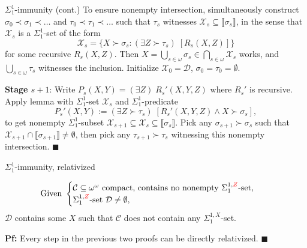\begin{frame}{$\Sigma_1^{1}$-immunity (cont.)}
  To ensure nonempty intersection, simultaneously construct
  $\sigma_0\prec\sigma_1\prec\ldots$ and $\tau_0\prec\tau_1\prec\ldots$
  such that $\tau_s$ witnesses $\mathcal{X}_s \subseteq
  \llbracket\sigma_s\rrbracket$, in the sense that $\mathcal{X}_s$ is a
  $\Sigma^1_1$-set of the form
  \[\mathcal{X}_s =\{X\succ\sigma_s: (\exists Z\succ\tau_s)\;
  [R_s(X,Z)]\}\]
  for some recursive $R_s(X,Z)$. Then $X=\bigcup_{s\in\omega} \sigma_s \in
  \bigcap_{s\in\omega} \mathcal{X}_s$ works, and
  $\bigcup_{s\in\omega} \tau_s$ witnesses the inclusion. Initialize
  $\mathcal{X}_0=\mathcal{D}$, $\sigma_0=\tau_0=\emptyset$.

  \vspace{1em}
  \textbf{Stage $s+1$}: Write $P_s(X,Y) =(\exists Z)\; R_s'(X,Y,Z)$ where
  $R_s'$ is recursive. Apply lemma with $\Sigma^1_1$-set
  $\mathcal{X}_s$ and $\Sigma^1_1$-predicate 
  \[P_s'(X,Y) :=(\exists Z\succ\tau_s)\; [R_s'(X,Y,Z) \wedge
  X\succ\sigma_s],\]
  to get nonempty $\Sigma^1_1$-subset $\mathcal{X}_{s+1} \subseteq
  \mathcal{X}_s \subseteq \llbracket\sigma_s\rrbracket$. Pick any
  $\sigma_{s+1}\succ\sigma_s$ such that $\mathcal{X}_{s+1}\cap
  \llbracket\sigma_{s+1}\rrbracket \neq\emptyset$, then pick any
  $\tau_{s+1}\succ\tau_s$ witnessing this nonempty intersection.
  $\blacksquare$
\end{frame}

\begin{frame}{$\Sigma_1^{1}$-immunity, relativized}
  \begin{coro*}
    \begin{align*}
      \text{Given } &\begin{cases}
        \mathcal{C}\subseteq\omega^\omega \text{ compact, contains
        no nonempty } \Sigma^{1,\textcolor{red}{Z}}_{1}\text{-set},\\
        \Sigma^{1,\textcolor{red}{Z}}_{1}\text{-set }
        \mathcal{D}\neq\emptyset,
      \end{cases}
    \end{align*}
    $\mathcal{D}$ contains some $X$ such that $\mathcal{C}$ does not
    contain any $\Sigma_1^{1,X}$-set.
  \end{coro*}

  \vspace{2em}
  \textbf{Pf:} Every step in the previous two proofs can be directly
  relativized.
  $\blacksquare$
\end{frame}
